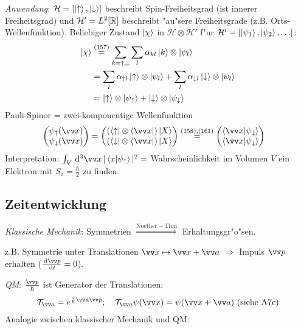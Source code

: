 \documentclass[a4paper]{scrartcl}
\newcommand{\RR}{\ensuremath \mathbb{R}}
\newcommand{\dd}{\ensuremath \, \mathrm{d}}
\newcommand{\matr}[1]{\begin{pmatrix} #1 \end{pmatrix}}
\begin{document}
{\emph{Anwendung}: $\mathcal H = [ \ket \uparrow, \ket \downarrow]$ beschreibt Spin-Freiheitsgrad (ist innerer Freiheitsgrad) und $\mathcal H' = L^2[\RR]$ beschreibt "au"sere Freiheitsgrade (z.B. Orts-Wellenfunktion). Beliebiger Zustand $\ket \chi$ in $\mathcal H \otimes \mathcal H'$ f"ur $\mathcal H' = [ \ket{\psi_1}, \ket{\psi_2}, \ldots ]$:
\begin{align}
\begin{split}
\ket \chi & \stackrel{(157)}= \sum_{k=\uparrow, \downarrow} \sum_l \alpha_{kl} \ket k \otimes \ket{\psi_l} \\
& = \sum_l \alpha_{\uparrow l} \ket \uparrow \otimes \ket{\psi_l} + \sum_l \alpha_{\downarrow l} \ket \downarrow \otimes \ket{\psi_l} \\
& = \ket \uparrow \otimes \ket{\psi_\uparrow} + \ket \downarrow \otimes \ket{\psi_\downarrow}
\end{split}
\end{align}
Pauli-Spinor = zwei-komponentige Wellenfunktion
\begin{align}
\matr{ \psi_\uparrow(\vv x) \\ \psi_\downarrow(\vv  x) } & = \matr{( \bra \uparrow \otimes \bra{\vv x}) \ket X \\ ( \bra \downarrow \otimes \bra{ \vv x}) \ket X} \stackrel{(158),(161)}= \matr{ \braket{ \vv x | \psi_\downarrow} \\ \braket{ \vv x | \psi_\downarrow}}
\end{align}
Interpretation: $\int_V \dd^3 \vv x \, \vert \braket{ x | \psi_\uparrow} \vert^2 = $ Wahrscheinlichkeit im Volumen $V$ ein Elektron mit $S_z = \frac \hbar 2$ zu finden.

\subsection{Zeitentwicklung}

\emph{Klassische Mechanik}: Symmetrien $\stackrel{\mathrm{Noether-Thm}}\Longrightarrow$ Erhaltungsgr"o"sen.

z.B. Symmetrie unter Translationen $\vv x \mapsto \vv x + \vv a$ $\Longrightarrow$ Impuls $\vv p$ erhalten ($\frac{\dd \vv p}{\dd t} = 0$).

\emph{QM}: $\frac{\vv p }{\hbar}$ ist Generator der Translationen:
\begin{align}
\mathcal T _{\vv a}= e^{\frac i \hbar \vv a \vv p}; \quad \mathcal T _{\vv a} \psi(\vv x) = \psi(\vv x + \vv a) \ (\mathrm{siehe \ A 7c})
\end{align}
Analogie zwischen klassischer Mechanik und QM:

}
\end{document}
